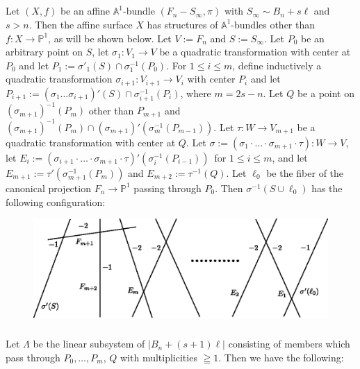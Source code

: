 \subsection{}\label{chap1:5.6}
Let $(X,f)$ be an affine $\mathbb{A}^{1}$-bundle
$(F_{n}-S_{\infty},\pi)$ with $S_{\infty}\sim B_{n}+s\ell$ and
$s>n$. Then the affine surface $X$ has structures of
$\mathbb{A}^{1}$-bundles other than $f:X\to \mathbb{P}^{1}$, as will
be shown below. Let $V:=F_{n}$ and $S:=S_{\infty}$. Let $P_{0}$ be an
arbitrary point on $S$, let $\sigma_{1}:V_{1}\to V$ be a quadratic
transformation with center at $P_{0}$ and let
$P_{1}:=\sigma'_{1}(S)\cap \sigma^{-1}_{1}(P_{0})$. For $1\leq i\leq
m$, define inductively a quadratic transformation
$\sigma_{i+1}:V_{i+1}\to V_{i}$ with center $P_{i}$ and let
$P_{i+1}:=(\sigma_{1}\ldots\sigma_{i+1})'(S)\cap
\sigma^{-1}_{i+1}(P_{i})$, where $m=2s-n$. Let $Q$ be a point on
$(\sigma_{m+1})^{-1}(P_{m})$ other than $P_{m+1}$ and
$(\sigma_{m+1})^{-1}(P_{m})\cap
(\sigma_{m+1})'(\sigma^{-1}_{m}(P_{m-1}))$. Let $\tau:W\to V_{m+1}$ be
a quadratic transformation with center at $Q$. Let
$\sigma:=(\sigma_{1}\cdot\ldots\cdot \sigma_{m+1}\cdot \tau):W\to V$,
let
$E_{i}:=(\sigma_{i+1}\cdot\ldots\cdot\sigma_{m+1}\cdot\tau)'(\sigma^{-1}_{i}(P_{i-1}))$\pageoriginale\
for $1\leq i\leq m$, and let
$E_{m+1}:=\tau'(\sigma^{-1}_{m+1}(P_{m}))$ and
$E_{m+2}:=\tau^{-1}(Q)$. Let $\ell_{0}$ be the fiber of the canonical
projection $F_{n}\to\mathbb{P}^{1}$ passing through $P_{0}$. Then
$\sigma^{-1}(S\cup\ell_{0})$ has the following configuration:
\begin{figure}[H]
\centering
\includegraphics[scale=.8]{figures/chap1-fig1.eps}
\end{figure}

\subsubsection{}\label{chap1:5.6.1}
Let $\Lambda$ be the linear subsystem of $|B_{n}+(s+1)\ell|$
consisting of members which pass through $P_{0},\ldots,P_{m}$, $Q$
with multiplicities $\geqq 1$. Then we have the following:

